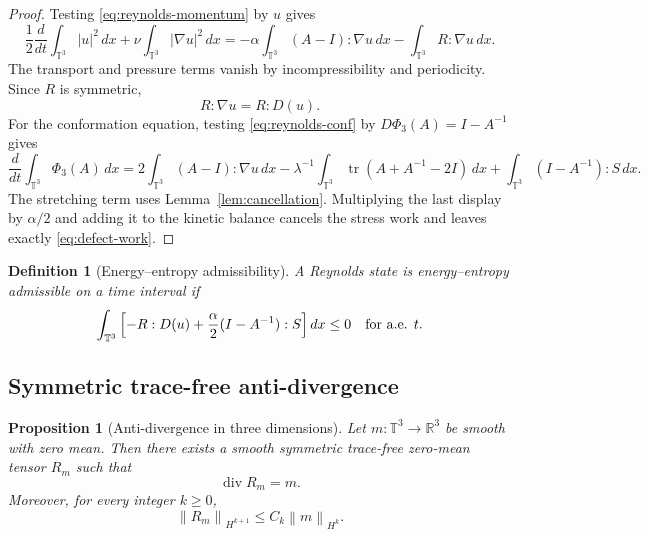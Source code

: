 \documentclass[11pt]{article}
\numberwithin{equation}{section}
\newtheorem{proposition}[theorem]{Proposition}
\newtheorem{definition}[theorem]{Definition}
\newcommand{\T}{\mathbb T}
\newcommand{\R}{\mathbb R}
\newcommand{\Id}{I}
\newcommand{\tr}{\operatorname{tr}}
\newcommand{\divv}{\operatorname{div}}
\newcommand{\norm}[1]{\left\lVert #1\right\rVert}
\begin{document}
\begin{proof}
Testing \eqref{eq:reynolds-momentum} by \(u\) gives
\[
  \frac12\frac{d}{dt}\int_{\T^3}|u|^2\,dx
  +\nu\int_{\T^3}|\nabla u|^2\,dx
  =
  -\alpha\int_{\T^3}(A-\Id):\nabla u\,dx
  -\int_{\T^3}R:\nabla u\,dx .
\]
The transport and pressure terms vanish by incompressibility and periodicity.
Since \(R\) is symmetric,
\[
  R:\nabla u=R:D(u).
\]
For the conformation equation, testing \eqref{eq:reynolds-conf} by
\(D\Phi_3(A)=\Id-A^{-1}\) gives
\[
  \frac{d}{dt}\int_{\T^3}\Phi_3(A)\,dx
  =
  2\int_{\T^3}(A-\Id):\nabla u\,dx
  -\lambda^{-1}\int_{\T^3}\tr(A+A^{-1}-2\Id)\,dx
  +\int_{\T^3}(\Id-A^{-1}):S\,dx .
\]
The stretching term uses Lemma~\ref{lem:cancellation}.  Multiplying the last
display by \(\alpha/2\) and adding it to the kinetic balance cancels the
stress work and leaves exactly \eqref{eq:defect-work}.
\end{proof}

\begin{definition}[Energy--entropy admissibility]
A Reynolds state is energy--entropy admissible on a time interval if
\begin{equation}
  \int_{\T^3}
  \left[
  -R:D(u)+\frac{\alpha}{2}(\Id-A^{-1}):S
  \right]dx
  \le0
  \quad\hbox{for a.e. }t.
  \label{eq:admissibility}
\end{equation}
\end{definition}

\subsection{Symmetric trace-free anti-divergence}

\begin{proposition}[Anti-divergence in three dimensions]
\label{prop:antidiv}
Let \(m:\T^3\to\R^3\) be smooth with zero mean.  Then there exists a smooth
symmetric trace-free zero-mean tensor \(R_m\) such that
\[
  \divv R_m=m.
\]
Moreover, for every integer \(k\ge0\),
\[
  \norm{R_m}_{H^{k+1}}\le C_k\norm{m}_{H^k}.
\]
\end{proposition}
\end{document}
